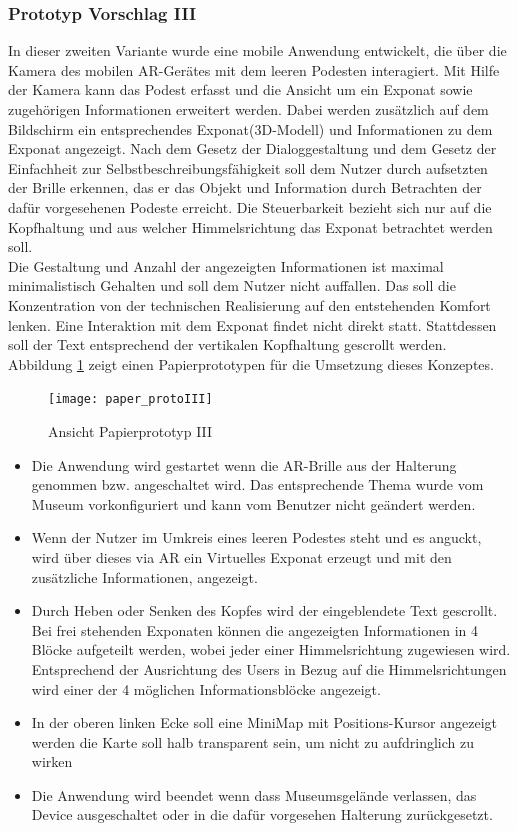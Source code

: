 \documentclass[runningheads,a4paper]{llncs}
\begin{document}
\subsubsection{Prototyp Vorschlag III} \label{chapt:paperprotoIII}
In dieser zweiten Variante wurde eine mobile Anwendung entwickelt, die über die Kamera des mobilen AR-Gerätes mit dem leeren Podesten interagiert. Mit Hilfe der Kamera kann das Podest erfasst und die Ansicht um ein Exponat sowie zugehörigen Informationen erweitert werden. Dabei werden zusätzlich auf dem Bildschirm ein entsprechendes Exponat(3D-Modell) und Informationen zu dem Exponat angezeigt. Nach dem Gesetz der Dialoggestaltung und dem Gesetz der Einfachheit zur Selbstbeschreibungsfähigkeit soll dem Nutzer durch aufsetzten der Brille erkennen, das er das Objekt und Information durch Betrachten der dafür vorgesehenen Podeste erreicht. Die Steuerbarkeit bezieht sich nur auf die Kopfhaltung und aus welcher Himmelsrichtung das Exponat betrachtet werden soll.
\\ Die Gestaltung und Anzahl der angezeigten Informationen ist maximal minimalistisch Gehalten und soll dem Nutzer nicht auffallen. Das soll die Konzentration von der technischen Realisierung auf den entstehenden Komfort lenken. Eine Interaktion mit dem Exponat findet nicht direkt statt. Stattdessen soll der Text entsprechend der  vertikalen Kopfhaltung gescrollt werden.
\\ Abbildung \ref{fig:prototype_III} zeigt einen Papierprototypen für die Umsetzung dieses Konzeptes.

\begin{figure}[H]
	\centering
	\texttt{[image: paper\_protoIII]}
	\caption{Ansicht Papierprototyp III}
	\label{fig:prototype_III}
\end{figure} 


\begin{itemize}
	\item Die Anwendung wird gestartet wenn die AR-Brille aus der Halterung genommen bzw. angeschaltet wird.
	\subitem Das entsprechende Thema wurde vom Museum vorkonfiguriert und kann vom Benutzer nicht geändert werden. 
	\item Wenn der Nutzer im Umkreis eines leeren Podestes steht und es anguckt, wird über dieses via AR ein Virtuelles Exponat erzeugt und mit den zusätzliche Informationen, angezeigt.\item Durch Heben oder Senken des Kopfes wird der eingeblendete Text gescrollt.
	\subitem Bei frei stehenden Exponaten können die angezeigten Informationen in 4 Blöcke aufgeteilt werden, wobei jeder einer Himmelsrichtung zugewiesen wird.
	\subitem Entsprechend der Ausrichtung des Users in Bezug auf die Himmelsrichtungen wird einer der 4 möglichen Informationsblöcke angezeigt.
	\item In der oberen linken Ecke soll eine MiniMap mit Positions-Kursor angezeigt werden
	\subitem die Karte soll halb transparent sein, um nicht zu aufdringlich zu wirken
	\item Die Anwendung wird beendet wenn dass Museumsgelände verlassen, das Device ausgeschaltet oder in die dafür vorgesehen Halterung zurückgesetzt.
	
\end{itemize}
\end{document}
